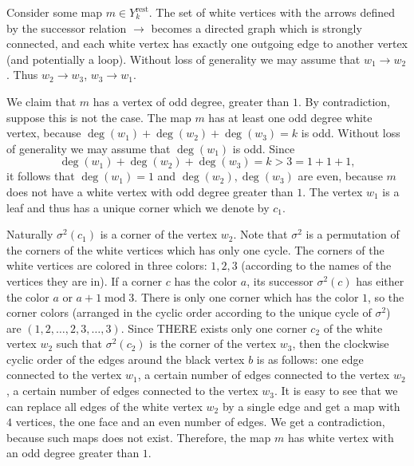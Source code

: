 \documentclass[submission]{FPSAC2021}
\DeclareMathOperator{\degg}{deg}
\DeclareMathOperator{\rest}{rest}
\newcommand{\nast}
{
	\sigma
}
\begin{document}
Consider some map $m\in Y_{k}^{\rest}$. 
The set of white vertices with the arrows defined by the successor relation
$\rightarrow$ becomes a directed graph which is strongly connected, and each
white vertex has exactly one outgoing edge to another vertex (and potentially a
loop). Without  loss  of  generality  we  may  assume  that $w_1 \rightarrow w_2$. Thus $w_2 \rightarrow w_3$, $w_3 \rightarrow w_1$.


We claim that $m$ has a  vertex of odd degree, greater than $1$. By contradiction,  suppose this is not the case. The map $m$ has at least one odd degree white vertex,
because $\degg(w_1)+\degg(w_2)+\degg(w_3)=k$ is odd. Without loss of generality we may assume that $\degg(w_1)$ is odd. Since $$\degg(w_1)+\degg(w_2)+\degg(w_3)=k>3=1+1+1,$$ %
it follows that $\degg(w_1)=1$ and $\degg(w_2),\degg(w_3)$ are even, because $m$
does not have a white vertex with odd degree greater than $1$. The vertex $w_1$ is a leaf and thus
has a unique corner which we denote by $c_1$.

Naturally $\nast^2(c_1)$ 
is a corner of the vertex $w_2$. 
Note that $\nast^2$ is a permutation of the corners of 
the white vertices which has only one cycle. 
The corners of the white vertices are colored in three colors: $1, 2, 3$
(according to the names of the vertices they are in).  
If a corner $c$ has the color $a$, 
its successor $\nast^2(c)$ has either the color $a$ or $a+1 \operatorname{mod} 3$. 
There is only one corner which has the color $1$, so the corner colors 
(arranged in the cyclic order according to the unique cycle of $\nast^2$) are 
$(1, 2, \ldots, 2, 3, \ldots, 3)$.
Since THERE exists only one corner $ c_2 $ of the white vertex $ w_2 $ such 
that $ \nast ^ 2 (c_2) $ is the corner of the vertex $ w_3 $, 
then the clockwise cyclic order of the edges around the black vertex $b$ is as
follows: one edge connected to the vertex $w_1$, a certain number of edges connected
to the vertex $w_2$, a certain number of edges connected to the vertex $w_3$. 
It is easy to see that we can replace all edges of the white vertex $w_2$ by a
single edge and get a map with $4$ vertices, the one face and an even number of
edges. We get a contradiction, because such maps does not exist.  Therefore, the
map $m$ has white vertex with an odd degree greater than $1$.
\end{document}
